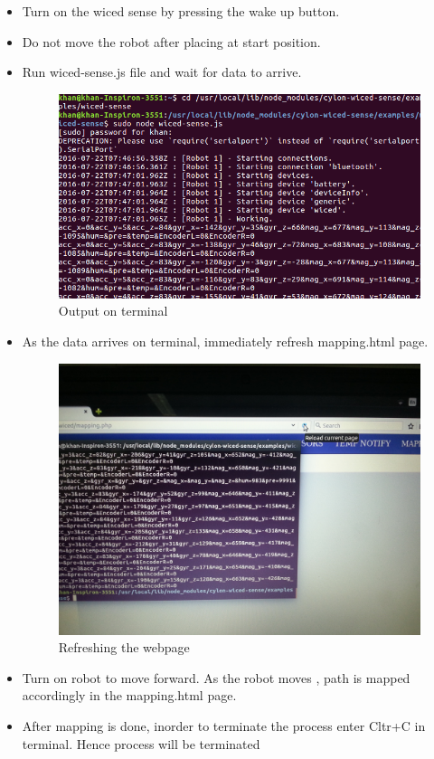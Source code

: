 \documentclass[11pt,a4paper]{article}
\begin{document}
\begin{itemize}
	 
	 \newpage
	\item Turn on the wiced sense by pressing the wake up button.
	 \item Do not move the robot after placing at start position.
	 \item Run wiced-sense.js file and wait for data to arrive.
	 
	 	\begin{figure}[h]
    \centering
	\includegraphics[scale=0.5]{data_arraives.png}
	
	\caption{Output on terminal}
	\end{figure}
	
	\item As the data arrives on terminal, immediately refresh mapping.html page.
	
		\newpage
		\begin{figure}[h]
    \centering
	\includegraphics[scale=0.1]{20160722_195821.jpg}
	\caption{Refreshing the webpage}
	\end{figure}
	

	\item Turn on robot to move forward. As the robot moves , path is mapped accordingly in the mapping.html page.
	
	\item After mapping is done, inorder to terminate the process enter Cltr+C in terminal. Hence process will be terminated
	 	 \end{itemize}


	
\end{document}
